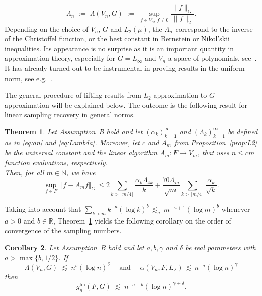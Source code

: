 \documentclass[a4paper,12pt]{amsart}
\newtheorem{theorem}{Theorem}
\newtheorem{corollary}[theorem]{Corollary}
\theoremstyle{definition}
\theoremstyle{remark}
\newcommand{\lin}{\ensuremath{\mathrm{lin}}}
\begin{document}
\begin{equation}\label{eq:Lambda}
\Lambda_n \;:=\;
\Lambda(V_n,G) \;:=\; 
 \sup\limits_{f \in V_n, \, f\neq 0} \frac{\|f\|_G}{\|f\|_2}.  
\end{equation}
Depending on the choice of $V_n$, {$G$ and $L_2(\mu)$,}
the $\Lambda_n$
correspond to the inverse of the Christoffel function, or the best constant in Bernstein or Nikol'skii inequalities.
Its appearance is no surprise as 
it is 
an important quantity in approximation theory, 
especially for $G=L_\infty$ and $V_n$ a space of polynomials, see~\cite{Freud,Gr19,Nevai}.  
It has already %
turned out to be instrumental in 
proving results in the uniform norm, see e.g.~\cite{KWW,PU}.

\smallskip
\goodbreak

The general procedure of lifting results from $L_2$-approximation to $G$-approximation will be explained 
{below}.
The outcome is the following result for linear sampling recovery 
in general norms.

\smallskip

\begin{theorem}\label{thm:general}
Let 
\hyperlink{assum}
{Assumption~B} hold and
let $(\alpha_k)_{k=1}^\infty$ and $(\Lambda_k)_{k=1}^\infty$ be defined as in \eqref{eq:an} and \eqref{eq:Lambda}. 
Moreover, let $c$ and $A_m$ 
from Proposition~\ref{prop:L2}
be the universal constant 
and the linear algorithm
$A_m \colon  F \to V_m$, that uses  $n\leq c m $ function evaluations, 
respectively. \\
Then, for all $m\in\mathbb{N}$,
we have 
$$
\sup_{f\in F}\, \Vert f - A_m f  \Vert_{G} \,\le
 {2} \sum_{k > \lfloor m/4 \rfloor} \frac{\alpha_k \Lambda_{4k}}{k} 
	+ \frac{70\Lambda_m}{\sqrt{m}}\sum_{k > \lfloor m/4 \rfloor} \frac{ \alpha_k}{\sqrt{k}}.
$$
\end{theorem}

\smallskip
\goodbreak

Taking into account that 
$
\sum_{k>m} k^{-a} (\log k)^b
 \,\lesssim_{a}\, m^{-a+1} (\log m)^b
 $
 whenever $a>0$ and $b\in\mathbb{R}$, Theorem~\ref{thm:general} yields
the following corollary on the order of convergence of the sampling numbers.

\begin{corollary}\label{coro:general}   
Let 
\hyperlink{assum}
{Assumption~B} hold and let 
$a,b,\gamma$ and $\delta$ be real parameters with $a > \max\{b, 1/2\}$.
If
\[
\Lambda(V_n,G)  
\;\lesssim\; n^b (\log n)^{\delta}
\quad \text{ and } \quad 
\alpha(V_n,F, L_2)
\,\lesssim\, n^{-a} (\log n)^\gamma
\]
then
\[
g_n^{\lin} (F, G) \;\lesssim\; n^{-a+b} (\log n)^{\gamma+\delta}.
\]
\end{corollary}
\end{document}
